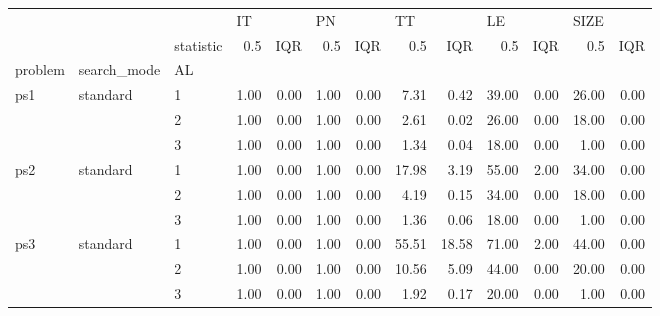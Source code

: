 \begin{tabular}{lllrrrrrrrrrr}
\toprule
    &          & {} & \multicolumn{2}{l}{IT} & \multicolumn{2}{l}{PN} & \multicolumn{2}{l}{TT} & \multicolumn{2}{l}{LE} & \multicolumn{2}{l}{SIZE} \\
    &          & statistic &  0.5 &  IQR &  0.5 &  IQR &   0.5 &   IQR &   0.5 &  IQR &   0.5 &  IQR \\
problem & search\_mode & AL &      &      &      &      &       &       &       &      &       &      \\
\midrule
ps1 & standard & 1 & 1.00 & 0.00 & 1.00 & 0.00 &  7.31 &  0.42 & 39.00 & 0.00 & 26.00 & 0.00 \\
    &          & 2 & 1.00 & 0.00 & 1.00 & 0.00 &  2.61 &  0.02 & 26.00 & 0.00 & 18.00 & 0.00 \\
    &          & 3 & 1.00 & 0.00 & 1.00 & 0.00 &  1.34 &  0.04 & 18.00 & 0.00 &  1.00 & 0.00 \\
ps2 & standard & 1 & 1.00 & 0.00 & 1.00 & 0.00 & 17.98 &  3.19 & 55.00 & 2.00 & 34.00 & 0.00 \\
    &          & 2 & 1.00 & 0.00 & 1.00 & 0.00 &  4.19 &  0.15 & 34.00 & 0.00 & 18.00 & 0.00 \\
    &          & 3 & 1.00 & 0.00 & 1.00 & 0.00 &  1.36 &  0.06 & 18.00 & 0.00 &  1.00 & 0.00 \\
ps3 & standard & 1 & 1.00 & 0.00 & 1.00 & 0.00 & 55.51 & 18.58 & 71.00 & 2.00 & 44.00 & 0.00 \\
    &          & 2 & 1.00 & 0.00 & 1.00 & 0.00 & 10.56 &  5.09 & 44.00 & 0.00 & 20.00 & 0.00 \\
    &          & 3 & 1.00 & 0.00 & 1.00 & 0.00 &  1.92 &  0.17 & 20.00 & 0.00 &  1.00 & 0.00 \\
\bottomrule
\end{tabular}

